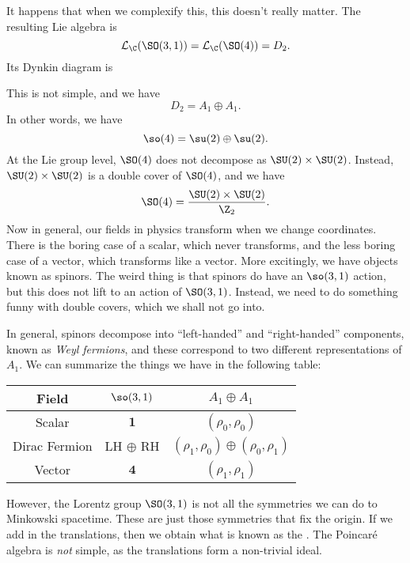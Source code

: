 \documentclass[a4paper]{article}
\begin{document}
It happens that when we complexify this, this doesn't really matter. The resulting Lie algebra is
\[
  \mathcal{L}_\C(\SO(3, 1)) = \mathcal{L}_\C(\SO(4)) = D_2.
\]
Its Dynkin diagram is
\begin{center}
\end{center}
This is not simple, and we have
\[
  D_2 = A_1 \oplus A_1.
\]
In other words, we have
\[
  \so(4) = \su(2) \oplus \su(2).
\]
At the Lie group level, $\SO(4)$ does not decompose as $\SU(2) \times \SU(2)$. Instead, $\SU(2) \times \SU(2)$ is a double cover of $\SO(4)$, and we have
\[
  \SO(4) = \frac{\SU(2) \times \SU(2)}{\Z_2}.
\]
Now in general, our fields in physics transform when we change coordinates. There is the boring case of a scalar, which never transforms, and the less boring case of a vector, which transforms like a vector. More excitingly, we have objects known as spinors. The weird thing is that spinors do have an $\so(3, 1)$ action, but this does not lift to an action of $\SO(3, 1)$. Instead, we need to do something funny with double covers, which we shall not go into.

In general, spinors decompose into ``left-handed'' and ``right-handed'' components, known as \emph{Weyl fermions}, and these correspond to two different representations of $A_1$. We can summarize the things we have in the following table:
\begin{center}
  \begin{tabular}{ccc}
    \toprule
    Field & $\so(3, 1)$ & $A_1 \oplus A_1$\\
    \midrule
    Scalar & $\mathbf{1}$ & $(\rho_0, \rho_0)$\\
    Dirac Fermion & LH $\oplus$ RH & $(\rho_1, \rho_0) \oplus (\rho_0, \rho_1)$\\
    Vector & $\mathbf{4}$ & $(\rho_1, \rho_1)$\\
    \bottomrule
  \end{tabular}
\end{center}
However, the Lorentz group $\SO(3, 1)$ is not all the symmetries we can do to Minkowski spacetime. These are just those symmetries that fix the origin. If we add in the translations, then we obtain what is known as the . The Poincar\'e algebra is \emph{not} simple, as the translations form a non-trivial ideal.
\end{document}
